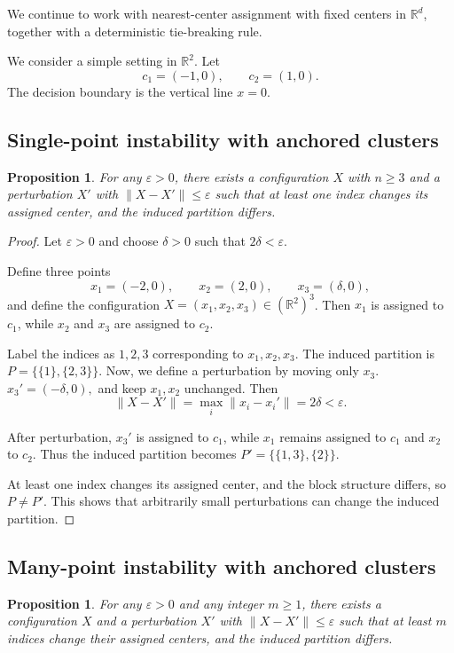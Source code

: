 \documentclass[11pt]{amsart}
\theoremstyle{plain}
\newtheorem{proposition}[subsection]{Proposition}
\theoremstyle{definition}
\begin{document}
We continue to work with nearest-center assignment with fixed centers in $\mathbb{R}^d$, together with a deterministic tie-breaking rule.

We consider a simple setting in $\mathbb{R}^2$. Let
\[
c_1 = (-1,0), \qquad c_2 = (1,0).
\]
The decision boundary is the vertical line $x = 0$.

\subsection{Single-point instability with anchored clusters}

\begin{proposition}
For any $\varepsilon > 0$, there exists a configuration $X$ with $n \ge 3$ and a perturbation $X'$ with $\|X - X'\| \le \varepsilon$ such that at least one index changes its assigned center, and the induced partition differs.
\end{proposition}

\begin{proof}
Let $\varepsilon > 0$ and choose $\delta > 0$ such that $2\delta < \varepsilon$.

Define three points
\[
x_1 = (-2,0), \qquad x_2 = (2,0), \qquad x_3 = (\delta,0),
\]
and define the configuration $X = (x_1,x_2,x_3) \in (\mathbb{R}^2)^3$. Then $x_1$ is assigned to $c_1$, while $x_2$ and $x_3$ are assigned to $c_2$.

Label the indices as $1,2,3$ corresponding to $x_1,x_2,x_3$. The induced partition is
$P = \{\{1\}, \{2,3\}\}.$
Now, we define a perturbation by moving only $x_3$.
$x_3' = (-\delta,0),$
and keep $x_1, x_2$ unchanged. Then
\[
\|X - X'\| = \max_i \|x_i - x_i'\| = 2\delta < \varepsilon.
\]

After perturbation, $x_3'$ is assigned to $c_1$, while $x_1$ remains assigned to $c_1$ and $x_2$ to $c_2$. Thus the induced partition becomes
$P' = \{\{1,3\}, \{2\}\}.$

At least one index changes its assigned center, and the block structure differs, so $P \ne P'$. This shows that arbitrarily small perturbations can change the induced partition.
\end{proof}

\subsection{Many-point instability with anchored clusters}

\begin{proposition}
For any $\varepsilon > 0$ and any integer $m \ge 1$, there exists a configuration $X$ and a perturbation $X'$ with $\|X - X'\| \le \varepsilon$ such that at least $m$ indices change their assigned centers, and the induced partition differs.
\end{proposition}
\end{document}
